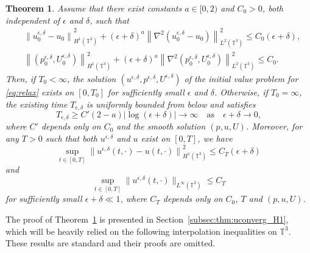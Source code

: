 \documentclass[reqno,10pt]{amsart}
\newtheorem{theorem}{Theorem}[section]
\theoremstyle{definition}
\theoremstyle{remark}
\numberwithin{equation}{section}
\begin{document}
\begin{theorem} \label{thm:uconverg_H1}
    Assume that there exist constants $a \in [0,2)$ and $C_0>0$, both independent of $\epsilon$ and $\delta$, such that
    \begin{subequations} \label{eq:uH1_assump}
    \begin{align}
        &{\| u_0^{\epsilon,\delta}-u_0\|}_{H^1(\mathbb T^3)}^2 + (\epsilon+\delta)^a \left\|\nabla^2 \left(u_0^{\epsilon,\delta}-u_0\right)\right\|_{L^2(\mathbb T^3)}^2 \le C_0(\epsilon+\delta), \label{eq:H1_assump_u} \\
        &\left\| \left(p_0^{\epsilon,\delta},U_0^{\epsilon,\delta}\right) \right\|_{H^1(\mathbb T^3)}^2 + (\epsilon+\delta)^a \left\| \nabla^2\left(p_0^{\epsilon,\delta},U_0^{\epsilon,\delta}\right) \right\|_{L^2(\mathbb T^3)}^2 \le C_0.
    \end{align}
    \end{subequations}
    Then, if $T_0<\infty$, the solution $(u^{\epsilon,\delta},p^{\epsilon,\delta},U^{\epsilon,\delta})$ of the initial value problem for \eqref{eq:relax} exists on $[0,T_0]$ for sufficiently small $\epsilon$ and $\delta$.
    Otherwise, if $T_0=\infty$, the existing time $T_{\epsilon,\delta}$ is uniformly bounded from below and satisfies
    \begin{equation} \label{eq:Texist}
        T_{\epsilon,\delta} \ge C'(2-a)|\log(\epsilon+\delta)| \to \infty \quad \text{as} 
        \quad \epsilon+\delta\to 0,
    \end{equation}
    where $C'$ depends only on $C_0$ and the smooth solution $(p,u,U)$. 
    Moreover, for any $T>0$ such that both $u^{\epsilon,\delta}$ and $u$ exist on $[0,T]$, we have
    \begin{equation} \label{eq:u_converg}
        \sup_{t\in[0,T]} {\| u^{\epsilon,\delta}(t,\cdot)-u(t,\cdot)\|}_{H^1(\mathbb T^3)}^2 \le C_T(\epsilon+\delta)
    \end{equation}
    and
    \begin{equation} \label{eq:u_Linf_bound}
       \sup_{t\in[0,T]} \| u^{\epsilon,\delta}(t,\cdot)\|_{L^\infty(\mathbb T^3)} \le C_T    
    \end{equation}
    for sufficiently small $\epsilon+\delta \ll 1$, where $C_T$ depends only on $C_0$, $T$ and $(p,u,U)$.
\end{theorem}

The proof of Theorem~\ref{thm:uconverg_H1} is presented in Section~\ref{subsec:thm:uconverg_H1}, which will be heavily relied on the following interpolation inequalities on $\mathbb T^3$. These results are standard \cite{Adams2003,temam2001ns} and their proofs are omitted.
\end{document}
